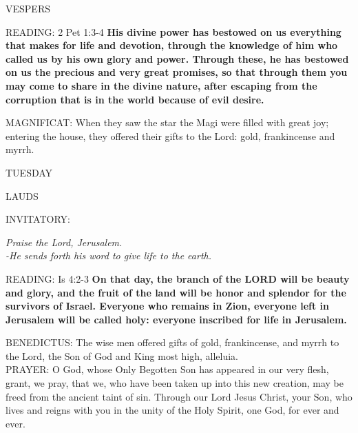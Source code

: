 \begin{flushleft}\normalsize{\uppercase{VESPERS\\}}\end{flushleft}
\noindent\small{\uppercase{READING:}}   2 Pet 1:3-4 \textbf{  His divine power has bestowed on us everything that makes for life and devotion, through the knowledge of him who called us by his own glory and power. Through these, he has bestowed on us the precious and very great promises, so that through them you may come to share in the divine nature, after escaping from the corruption that is in the world because of evil desire.\\}

\noindent\small{\uppercase{MAGNIFICAT:}}	When they saw the star the Magi were filled with great joy; entering the house, they offered their gifts to the Lord: gold, frankincense and myrrh.\\

\begin{center}
\normalsize TUESDAY
\end{center}

\begin{flushleft}\normalsize{\uppercase{LAUDS\\}}\end{flushleft}
\small{\uppercase{INVITATORY:}}\normalsize
\begin{center}
\textit{Praise the Lord, Jerusalem.\\}
\textit{-He sends forth his word to give life to the earth.\\}
\end{center}
\noindent\small{\uppercase{READING:}}   Is 4:2-3 \textbf{  On that day, the branch of the LORD will be beauty and glory, and the fruit of the land will be honor and splendor for the survivors of Israel. Everyone who remains in Zion, everyone left in Jerusalem will be called holy: everyone inscribed for life in Jerusalem.\\}

\noindent\small{\uppercase{BENEDICTUS:}}	The wise men offered gifts of gold, frankincense, and myrrh to the Lord, the Son of God and King most high, alleluia.\\

\noindent\small{\uppercase{PRAYER:}}	O God, whose Only Begotten Son has appeared in our very flesh, grant, we pray, that we, who have been taken up into this new creation, may be freed from the ancient taint of sin. Through our Lord Jesus Christ, your Son, who lives and reigns with you in the unity of the Holy Spirit, one God, for ever and ever.

